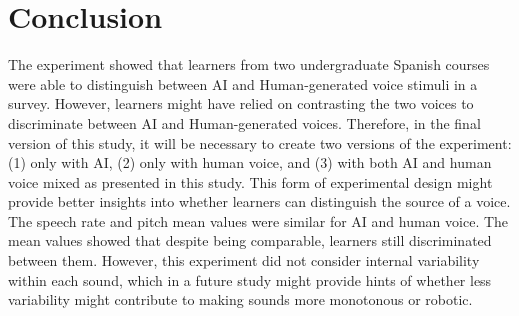 \documentclass[
  a4paper,
  11pt,
  twocolumn]{article}
\begin{document}
\section{Conclusion}

The experiment showed that learners from two undergraduate Spanish
courses were able to distinguish between AI and Human-generated voice
stimuli in a survey. However, learners might have relied on contrasting
the two voices to discriminate between AI and Human-generated voices.
Therefore, in the final version of this study, it will be necessary to
create two versions of the experiment: (1) only with AI, (2) only with
human voice, and (3) with both AI and human voice mixed as presented in
this study. This form of experimental design might provide better
insights into whether learners can distinguish the source of a voice.
The speech rate and pitch mean values were similar for AI and human
voice. The mean values showed that despite being comparable, learners
still discriminated between them. However, this experiment did not
consider internal variability within each sound, which in a future study
might provide hints of whether less variability might contribute to
making sounds more monotonous or robotic.



\end{document}
